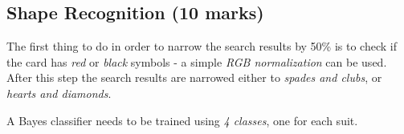 
\subsection{Shape Recognition (10 marks)}

The first thing to do in order to narrow the search results by 50\% is to check if the card has \textit{red} or \textit{black} symbols - a simple \textit{RGB normalization} can be used. After this step the search results are narrowed either to \textit{spades and clubs}, or \textit{hearts and diamonds}.

A Bayes classifier needs to be trained using \textit{4 classes}, one for each suit.

\newpage
